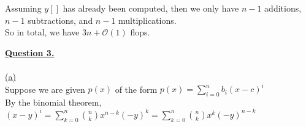 \documentclass[12pt]{article}
\begin{document}
Assuming $y[]$ has already been computed, then we only have $n-1$ additions, $n-1$ subtractions, and $n-1$ multiplications.\\
So in total, we have $3n + \mathcal{O}(1)$ flops.




\newpage
{{\LARGE \underline{\textbf{Question 3.}}}}\\
~\\\hyperlink{toc}{\hypertarget{3.1}{(a)}}\\
Suppose we are given $p(x)$ of the form $p(x) = \sum_{i=0}^{n}b_i(x-c)^i$\\
By the binomial theorem, $(x-y)^i = \sum_{k=0}^{n} \binom{n}{k} x^{n-k}(-y)^k = \sum_{k=0}^{n} \binom{n}{k} x^k(-y)^{n-k}$\\
\end{document}
